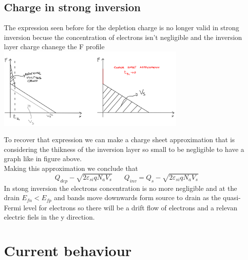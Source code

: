 \subsection{Charge in strong inversion}
The expression seen before for the depletion charge is no longer valid in strong inversion becuse the concentration of electrons isn't negligible and the inversion layer charge chanege the F profile \\


\centering
\includegraphics[width=0.7\textwidth]{csa.png}\\
\raggedright

To recover that expression we can make a charge sheet approximation that is considering the thikness of the inversion layer so small to be negligible to have a graph like in figure above.\\
Making this approximation we conclude that
\begin{equation}
Q_{dep}-\sqrt{2\varepsilon_{si}qN_aV_s} \ \ \ \ \ \ \ \ Q_{inv}=Q_s-\sqrt{2\varepsilon_{si}qN_aV_s}
\end{equation}
In stong inversion the electrons concentration is no more negligible and at the drain $E_{fn}<E_{fp}$ and bands move downwards form source to drain as the quasi-Fermi level for electrons so there will be a drift flow of electrons and a relevan electric fiels in the y direction.

\section{Current behaviour}

